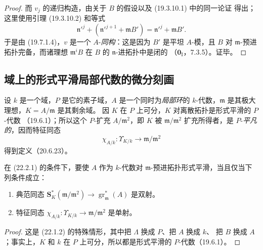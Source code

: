 \begin{proof}

而 $v_j$ 的递归构造，由关于 $B$ 的假设以及 (19.3.10.1) 中的同一论证
得出；这里使用引理 (19.3.10.2) 和等式
\[
  \mathfrak n'^j+(\mathfrak n'^{j+1}+\mathfrak mB')
  =\mathfrak n'^j+\mathfrak mB'.
\]
于是由 (19.7.1.4)，$v$ 是一个 $A$-\emph{同构}：这是因为 $B'$ 是平坦
$A$-模，且 $B$ 对 $\mathfrak m$-预进拓扑完备，而诸理想
$\mathfrak m^iB$ 在 $B$ 的 $\mathfrak n$-进拓扑中是闭的
（$\mathbf 0_{\mathrm I}$，7.3.5）。证毕。
\end{proof}

\subsection{域上的形式平滑局部代数的微分刻画}
\label{subsection:0.22.2-fr}

\begin{env}[22.2.1]
\label{0.22.2.1-fr}
设 $k$ 是一个域，$P$ 是它的素子域，$A$ 是一个同时为\emph{局部环}的
$k$-代数，$\mathfrak m$ 是其极大理想，$K=A/\mathfrak m$ 是其剩余域。
因 $K$ 在 $P$ 上可分，$K$ 对离散拓扑是形式平滑的 $P$-代数
（19.6.1）；所以这个 $P$-扩充 $A/\mathfrak m^2$，即 $K$ 被
$\mathfrak m/\mathfrak m^2$ 扩充所得者，是 $P$-\emph{平凡的}，因而特征同态
\begin{equation}
\tag{22.2.1.1}
\label{0.22.2.1.1-fr}
  \chi_{A/k}:\Upsilon_{K/k}\longrightarrow\mathfrak m/\mathfrak m^2
\end{equation}
得到定义（20.6.23）。
\end{env}

\begin{theorem}[22.2.2]
\label{0.22.2.2-fr}
在 (22.2.1) 的条件下，要使 $A$ 作为 $k$-代数对
$\mathfrak m$-预进拓扑形式平滑，当且仅当下列条件成立：
\begin{enumerate}
  \item[(i)] 典范同态
  $\mathbf S_K^*(\mathfrak m/\mathfrak m^2)\to
  \operatorname{gr}_{\mathfrak m}^*(A)$ 是双射。
  \item[(ii)] 特征同态
  $\chi_{A/k}:\Upsilon_{K/k}\to\mathfrak m/\mathfrak m^2$ 是单射。
\end{enumerate}
\end{theorem}

\begin{proof}
这是 (22.1.2) 的特殊情形，其中把 $\Lambda$ 换成 $P$、把 $A$ 换成 $k$、
把 $B$ 换成 $A$；事实上，$K$ 和 $k$ 在 $P$ 上可分，所以都是形式平滑的
$P$-代数（19.6.1）。
\end{proof}

